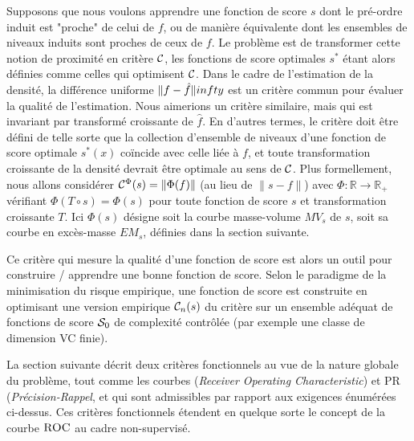 Supposons que nous voulons apprendre une fonction de score $ s $ dont le pré-ordre induit est "proche" de celui de $f$, ou de manière équivalente dont les ensembles de niveaux induits sont proches de ceux de $ f $. Le problème est de transformer cette notion de proximité en critère $ \crit $, les fonctions de score optimales $ s ^ * $ étant alors définies comme celles qui optimisent $ \crit $. Dans le cadre de l'estimation de la densité, la différence uniforme $ \| f - \hat f \| \\infty $ est un critère commun pour évaluer la qualité de l'estimation. Nous aimerions un critère similaire, mais qui est invariant par transformé croissante de $ \hat f $. En d'autres termes, le critère doit être défini de telle sorte que la collection d'ensemble de niveaux d'une fonction de score optimale $ s ^ * (x) $ coïncide avec celle liée à $ f $, et toute transformation croissante de la densité devrait être optimale au sens de $ \crit $.
Plus formellement, nous allons considérer $ \crit ^ {\Phi} (s) = \| \Phi (f) \| $ (au lieu de $ \| s - f \| $) 
avec $ \Phi: \mathbb {R} \to \mathbb {R} _ + $ vérifiant $ \Phi (T \circ s) = \Phi (s) $ pour toute fonction de score $ s $ et transformation croissante $ T $. Ici $ \Phi (s) $ désigne soit la courbe masse-volume $ MV_s $ de $ s $, soit sa courbe en excès-masse $ EM_s $, définies dans la section suivante.

Ce critère qui mesure la qualité d'une fonction de score est alors un outil pour construire / apprendre une bonne fonction de score.
Selon le paradigme de la minimisation du risque empirique, une fonction de score est construite en optimisant une version empirique $ \crit_n (s) $ du critère sur un ensemble adéquat de fonctions de score $ \S_0 $ de complexité contrôlée (par exemple une classe de dimension {\sc VC} finie).

La section suivante décrit deux critères fonctionnels au vue de la nature globale du problème, tout comme les courbes \roc (\emph{Receiver Operating Characteristic}) et PR (\emph {Précision-Rappel}, et qui sont admissibles par rapport aux exigences énumérées ci-dessus. Ces critères fonctionnels étendent en quelque sorte le concept de la courbe $ \roc $ au cadre non-supervisé.


